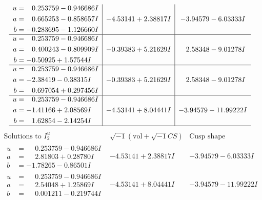 \documentclass[1p]{elsarticle_modified}
\theoremstyle{definition}
\newcommand{\I}{\sqrt{-1}}
\begin{document}
$$\begin{array}{c|c|c}
\begin{aligned}
u &= \phantom{-}0.253759 - 0.946686 I \\
a &= \phantom{-}0.665253 - 0.858657 I \\
b &= -0.283695 - 1.126660 I\end{aligned}
 & -4.53141 + 2.38817 I & -3.94579 - 6.03333 I \\ \hline\begin{aligned}
u &= \phantom{-}0.253759 - 0.946686 I \\
a &= \phantom{-}0.400243 - 0.809909 I \\
b &= -0.50925 + 1.57544 I\end{aligned}
 & -0.39383 + 5.21629 I & \phantom{-}2.58348 - 9.01278 I \\ \hline\begin{aligned}
u &= \phantom{-}0.253759 - 0.946686 I \\
a &= -2.38419 - 0.38315 I \\
b &= \phantom{-}0.697054 + 0.297456 I\end{aligned}
 & -0.39383 + 5.21629 I & \phantom{-}2.58348 - 9.01278 I \\ \hline\begin{aligned}
u &= \phantom{-}0.253759 - 0.946686 I \\
a &= -1.41166 + 2.08569 I \\
b &= \phantom{-}1.62854 - 2.14254 I\end{aligned}
 & -4.53141 + 8.04441 I & -3.94579 - 11.99222 I\\
 \hline 
 \end{array}$$\newpage$$\begin{array}{c|c|c}  
\text{Solutions to }I^u_{2}& \I (\text{vol} + \sqrt{-1}CS) & \text{Cusp shape}\\
 \hline 
\begin{aligned}
u &= \phantom{-}0.253759 - 0.946686 I \\
a &= \phantom{-}2.81803 + 0.28780 I \\
b &= -1.78265 - 0.86501 I\end{aligned}
 & -4.53141 + 2.38817 I & -3.94579 - 6.03333 I \\ \hline\begin{aligned}
u &= \phantom{-}0.253759 - 0.946686 I \\
a &= \phantom{-}2.54048 + 1.25869 I \\
b &= \phantom{-}0.001211 - 0.219744 I\end{aligned}
 & -4.53141 + 8.04441 I & -3.94579 - 11.99222 I \\ \hline\begin{aligned}

\end{aligned}
\end{array}$$
\end{document}
